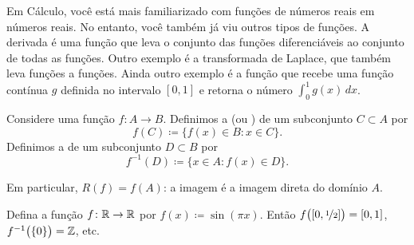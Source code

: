 \begin{example}
Em Cálculo, você está mais familiarizado com funções de números reais em
números reais. No entanto, você também já viu outros tipos de funções.
A derivada é uma função que leva o conjunto das funções diferenciáveis ao
conjunto de todas as funções.
Outro exemplo é a transformada de Laplace, que também leva funções a funções.
Ainda outro exemplo é a função que recebe uma função contínua $g$ definida
no intervalo $[0,1]$ e retorna o número $\int_0^1 g(x) \,dx$.
\end{example}

\begin{defn}
Considere uma função $f \colon A \to B$. Definimos
a \emph{} (ou \emph{}) de um
subconjunto $C \subset A$ por
\begin{equation*}
f(C) \coloneqq \bigl\{ f(x) \in B : x \in C \bigr\} .
\end{equation*}
Definimos a \emph{} de um subconjunto
$D \subset B$ por
\begin{equation*}
f^{-1}(D) \coloneqq \bigl\{ x \in A : f(x) \in D \bigr\} .
\end{equation*}
\end{defn}

Em particular, $R(f) = f(A)$: a imagem é a imagem direta do domínio $A$.

\begin{myfigureht}
\caption{Exemplo de imagens diretas e inversas para a fun\c{c}\~ao
$f \colon \{ 1,2,3,4 \} \to \{ a,b,c,d \}$ definida por
$f(1) \coloneqq b$,
$f(2) \coloneqq d$,
$f(3) \coloneqq c$,
$f(4) \coloneqq b$.\label{figfuncimags}}
\end{myfigureht}

\begin{example}
Defina a função $f \colon {\mathbb{R}} \to {\mathbb{R}}$ por
$f(x) \coloneqq \sin(\pi x)$. Então $f\bigl([0,\nicefrac{1}{2}]\bigr) = [0,1]$,
$f^{-1}\bigl(\{0\}\bigr) = {\mathbb{Z}}$, etc.
\end{example}

